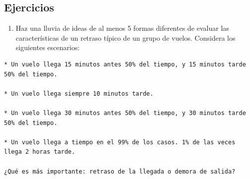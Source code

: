 \documentclass[11pt,oneside]{report}
\newenvironment{Shaded}{\begin{snugshade}}{\end{snugshade}}
\newcommand{\CommentTok}[1]{\textcolor[rgb]{0.56,0.35,0.01}{\textit{#1}}}
\newcommand{\DataTypeTok}[1]{\textcolor[rgb]{0.13,0.29,0.53}{#1}}
\newcommand{\KeywordTok}[1]{\textcolor[rgb]{0.13,0.29,0.53}{\textbf{#1}}}
\newcommand{\NormalTok}[1]{#1}
\newcommand{\OperatorTok}[1]{\textcolor[rgb]{0.81,0.36,0.00}{\textbf{#1}}}
\newcommand{\StringTok}[1]{\textcolor[rgb]{0.31,0.60,0.02}{#1}}
\providecommand{\tightlist}{%
  \setlength{\itemsep}{0pt}\setlength{\parskip}{0pt}}
\begin{document}
\begin{Shaded}
\end{Shaded}

\hypertarget{ejercicios-12}{%
\subsection{Ejercicios}\label{ejercicios-12}}

\begin{enumerate}
\def\labelenumi{\arabic{enumi}.}
\tightlist
\item
  Haz una lluvia de ideas de al menos 5 formas diferentes de evaluar las
  características de un retraso típico de un grupo de vuelos. Considera
  los siguientes escenarios:
\end{enumerate}

\begin{verbatim}
* Un vuelo llega 15 minutos antes 50% del tiempo, y 15 minutos tarde 50% del tiempo.

* Un vuelo llega siempre 10 minutos tarde.

* Un vuelo llega 30 minutos antes 50% del tiempo, y 30 minutos tarde 50% del tiempo.

* Un vuelo llega a tiempo en el 99% de los casos. 1% de las veces llega 2 horas tarde.

¿Qué es más importante: retraso de la llegada o demora de salida?
\end{verbatim}
\end{document}
